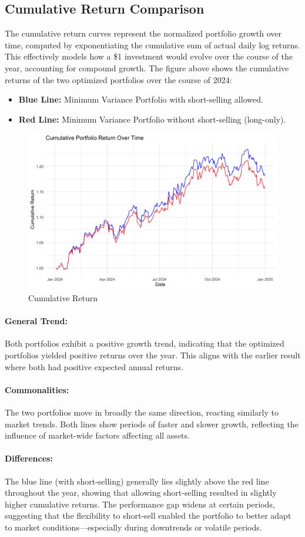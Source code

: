 \documentclass[12pt]{article}
\begin{document}
\subsection*{Cumulative Return Comparison}
The cumulative return curves represent the normalized portfolio growth over time, computed by exponentiating the cumulative sum of actual daily log returns. This effectively models how a \$1 investment would evolve over the course of the year, accounting for compound growth.
The figure above shows the cumulative returns of the two optimized portfolios over the course of 2024:
\begin{itemize}
    \item \textbf{Blue Line:} Minimum Variance Portfolio with short-selling allowed.
    \item \textbf{Red Line:} Minimum Variance Portfolio without short-selling (long-only).
\end{itemize}
\begin{figure} [H]
    \centering
    \includegraphics[width=0.6\linewidth]{Findings_Yutong/cumulative_return.png}
    \caption{Cumulative Return}
    \label{cum-return}
\end{figure}
     \paragraph{General Trend:} Both portfolios exhibit a positive growth trend, indicating that the optimized portfolios yielded positive returns over the year. This aligns with the earlier result where both had positive expected annual returns.
    \paragraph{Commonalities:}The two portfolios move in broadly the same direction, reacting similarly to market trends. Both lines show periods of faster and slower growth, reflecting the influence of market-wide factors affecting all assets.
    \paragraph{Differences:} The blue line (with short-selling) generally lies slightly above the red line throughout the year, showing that allowing short-selling resulted in slightly higher cumulative returns. The performance gap widens at certain periods, suggesting that the flexibility to short-sell enabled the portfolio to better adapt to market conditions—especially during downtrends or volatile periods.
\end{document}
